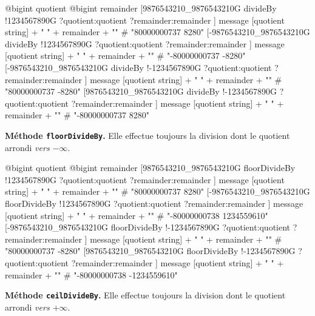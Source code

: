 \begin{galgas}
  @bigint quotient
  @bigint remainder
  [9876543210_9876543210G divideBy
    !1234567890G
    ?quotient:quotient
    ?remainder:remainder
  ]
  message [quotient string] + " " + remainder + "\n" # "80000000737 8280"
  [-9876543210_9876543210G divideBy
    !1234567890G
    ?quotient:quotient
    ?remainder:remainder
  ]
  message [quotient string] + " " + remainder + "\n" # "-80000000737 -8280"
  [-9876543210_9876543210G divideBy
    !-1234567890G
    ?quotient:quotient
    ?remainder:remainder
  ]
  message [quotient string] + " " + remainder + "\n" # "80000000737 -8280"
  [9876543210_9876543210G divideBy
    !-1234567890G
    ?quotient:quotient
    ?remainder:remainder
  ]
  message [quotient string] + " " + remainder + "\n" # "-80000000737 8280"
\end{galgas}





\textbf{Méthode \texttt{floorDivideBy}.} Elle effectue toujours la division dont le quotient arrondi \emph{vers $-\infty$}.

\begin{galgas}
  @bigint quotient
  @bigint remainder
  [9876543210_9876543210G floorDivideBy
    !1234567890G
    ?quotient:quotient
    ?remainder:remainder
  ]
  message [quotient string] + " " + remainder + "\n" # "80000000737 8280"
  [-9876543210_9876543210G floorDivideBy
    !1234567890G
    ?quotient:quotient
    ?remainder:remainder
  ]
  message [quotient string] + " " + remainder + "\n" # "-80000000738 1234559610"
  [-9876543210_9876543210G floorDivideBy
    !-1234567890G
    ?quotient:quotient
    ?remainder:remainder
  ]
  message [quotient string] + " " + remainder + "\n" # "80000000737 -8280"
  [9876543210_9876543210G floorDivideBy
    !-1234567890G
    ?quotient:quotient
    ?remainder:remainder
  ]
  message [quotient string] + " " + remainder + "\n" # "-80000000738 -1234559610"
\end{galgas}






\textbf{Méthode \texttt{ceilDivideBy}.} Elle effectue toujours la division dont le quotient arrondi \emph{vers $+\infty$}.

